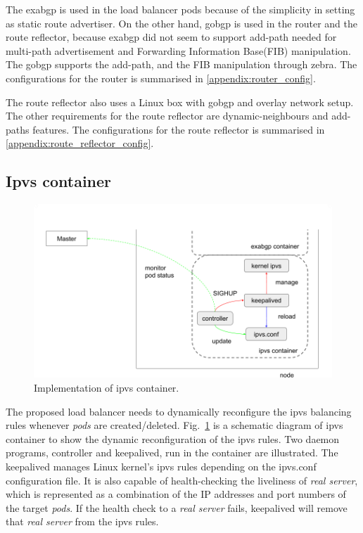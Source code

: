 The exabgp is used in the load balancer pods because of the simplicity in setting as static route advertiser.
On the other hand, gobgp is used in the router and the route reflector, because exabgp did not seem to support add-path\cite{walton2016advertisement} needed for multi-path advertisement and Forwarding Information Base(FIB) manipulation\cite{exa-networks_2018}.
The gobgp supports the add-path, and the FIB manipulation through zebra\cite{osrg_gobgp_zebra}.
The configurations for the router is summarised in \ref{appendix:router_config}.

The route reflector also uses a Linux box with gobgp and overlay network setup.
The other requirements for the route reflector are dynamic-neighbours and add-paths features.
The configurations for the route reflector is summarised in \ref{appendix:route_reflector_config}.


\subsection{Ipvs container}

\begin{figure}
\includegraphics[width=\columnwidth]{Figs/ipvs-ingress-schem}
\caption{Implementation of ipvs container.}
\label{fig:ipvs-ingress-schem}
\end{figure}

The proposed load balancer needs to dynamically reconfigure the ipvs balancing rules whenever {\em pods} are created/deleted. 
Fig.~\ref{fig:ipvs-ingress-schem} is a schematic diagram of ipvs container to show the dynamic reconfiguration of the ipvs rules.
Two daemon programs, controller and keepalived, run in the container are illustrated.
The keepalived manages Linux kernel's ipvs rules depending on the ipvs.conf configuration file.
It is also capable of health-checking the liveliness of {\em real server}, 
which is represented as a combination of the IP addresses and port numbers of the target {\em pods}. 
If the health check to a {\em real server} fails, keepalived will remove that {\em real server} from the ipvs rules.

